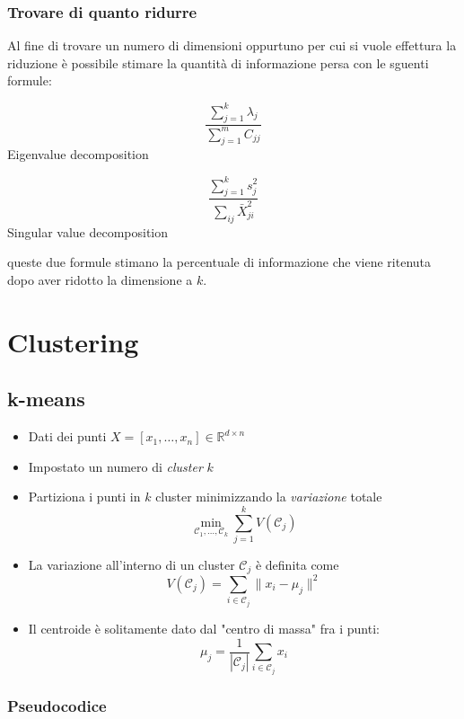 \subsubsection{Trovare di quanto ridurre}
Al fine di trovare un numero di dimensioni oppurtuno per cui si vuole effettura la riduzione è possibile stimare la quantità di informazione persa con le sguenti formule:
\vskip3mm
\begin{minipage}[t]{0.48\textwidth}
	\begin{center}
		\[
			\frac{\sum_{j=1}^k \lambda_j}{\sum_{j=1}^m C_{jj}}
		\]
		Eigenvalue decomposition
	\end{center}
\end{minipage}
%
\begin{minipage}[t]{0.48\textwidth}
	\begin{center}
		\[
			\frac{\sum_{j=1}^k s_j^2}{\sum_{ij} \bar{X}_{ji}^2}
		\]
		Singular value decomposition
	\end{center}
\end{minipage}
\vskip3mm
queste due formule stimano la percentuale di informazione che viene ritenuta dopo aver ridotto la dimensione a $ k $.

\section{Clustering}
\subsection{k-means}
\begin{itemize}
	\item Dati dei punti $X = [x_1, \ldots, x_n] \in \mathbb{R}^{d \times n}$
	\item Impostato un numero di \textit{cluster} $k$
	\item Partiziona i punti in $k$ cluster minimizzando la \textit{variazione} totale
	      \[
		      \min_{\mathcal{C}_1, \ldots, \mathcal{C}_k} \sum_{j=1}^k V(\mathcal{C}_j)
	      \]
	\item La variazione all'interno di un cluster $ \mathcal{C}_j $ è definita come
	      \[
		      V(\mathcal{C}_j) = \sum_{i \in \mathcal{C}_j} \| x_i - \mu_j \|^2
	      \]
	\item Il centroide è solitamente dato dal "centro di massa" fra i punti:
	      \[
		      \mu_j = \frac{1}{|\mathcal{C}_j|} \sum_{i \in \mathcal{C}_j} x_i
	      \]
\end{itemize}
\subsubsection{Pseudocodice}

